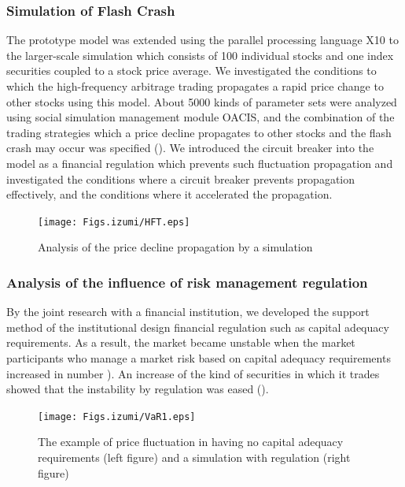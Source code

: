 \subsubsection{Simulation of Flash Crash}

The prototype model was extended using the parallel processing
language X10 to the larger-scale simulation which consists of 100
individual stocks and one index securities coupled to a stock price
average\cite{ToriiIzumiYamada2016}.  We investigated the conditions to
which the high-frequency arbitrage trading propagates a rapid price
change to other stocks using this model.  About 5000 kinds of
parameter sets were analyzed using social simulation management module
OACIS, and the combination of the trading strategies which a price
decline propagates to other stocks and the flash crash may occur was
specified ().
We introduced the circuit
breaker into the model as a financial regulation which prevents such
fluctuation propagation and investigated the conditions where a
circuit breaker prevents propagation effectively, and the conditions
where it accelerated the propagation.

\begin{figure}[htb]
  \centering
  \texttt{[image: Figs.izumi/HFT.eps]}
  \caption{Analysis of the price decline propagation by a simulation}
  \label{fig:Figs.izumi/hft.eps}
\end{figure}


\subsubsection{Analysis of the influence of risk management regulation}


By the joint research with a financial institution, we developed the
support method of the institutional design financial regulation such
as capital adequacy requirements\cite{YonenoIzumi2018}.  As a result,
the market became unstable when the market participants who manage a
market risk based on capital adequacy requirements increased in number
).  An increase of the kind of
securities in which it trades showed that the instability by
regulation was eased ().

\begin{figure}[htb]
  \centering
  \texttt{[image: Figs.izumi/VaR1.eps]}
  \caption{The example of price fluctuation in having no capital adequacy requirements (left figure) and a simulation with regulation (right figure)}
  \label{fig:Figs.izumi/var1.eps}
\end{figure}

